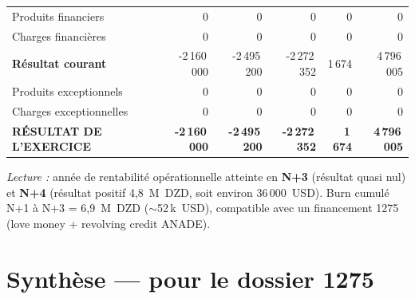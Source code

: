 \documentclass[11pt,a4paper]{article}
\begin{document}
\begin{center}
\begin{longtable}{l r r r r r}
\midrule
Produits financiers                         &      0      &      0      &       0      &       0      &       0      \\
Charges financières                         &      0      &      0      &       0      &       0      &       0      \\
\midrule
\rowcolor{tablesub}\textbf{Résultat courant}                & -2\,160\,000 & -2\,495\,200 & -2\,272\,352 &       1\,674 &  4\,796\,005 \\

\midrule
Produits exceptionnels                      &      0      &      0      &       0      &       0      &      0      \\
Charges exceptionnelles                     &      0      &      0      &       0      &      0      &      0      \\
\midrule
\rowcolor{tablesub}\textbf{RÉSULTAT DE L'EXERCICE}          & \textbf{-2\,160\,000} & \textbf{-2\,495\,200} & \textbf{-2\,272\,352} & \textbf{1\,674} & \textbf{4\,796\,005} \\

\bottomrule
\end{longtable}
\end{center}

\noindent\textit{Lecture :} année de rentabilité opérationnelle atteinte en \textbf{N+3} (résultat quasi nul) et \textbf{N+4} (résultat positif 4{,}8~M~DZD, soit environ 36\,000~USD). Burn cumulé N+1 à N+3 = 6{,}9~M~DZD ($\sim$52\,k~USD), compatible avec un financement 1275 (\og love money \fg{} + revolving credit ANADE).

\section{Synthèse — pour le dossier 1275}
\end{document}
